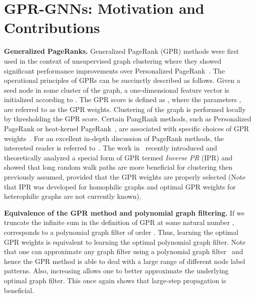 \documentclass{article} \usepackage{iclr2021_conference,times}
\begin{document}
\section{GPR-GNNs: Motivation and Contributions}\label{sec:GPRandGPGNN}
\textbf{Generalized PageRanks. }Generalized PageRank (GPR) methods were first used in the context of unsupervised graph clustering where they showed significant performance improvements over Personalized PageRank~\citep{kloumann2017block,li2019optimizing}. The operational principles of GPRs can be succinctly described as follows. Given a seed node  in some cluster of the graph, a one-dimensional feature vector  is initialized according to . The GPR score is defined as , where the parameters , are referred to as the GPR weights. Clustering of the graph is performed locally by thresholding the GPR score. Certain PangRank methods, such as Personalized PageRank or heat-kernel PageRank~\citep{chung2007heat}, are associated with specific choices of GPR weights~\citep{li2019optimizing}. For an excellent in-depth discussion of PageRank methods, the interested reader is referred to~\citep{gleich2015pagerank}. The work in~\citet{li2019optimizing} recently introduced and theoretically analyzed a special form of GPR termed \emph{Inverse PR} (IPR) and showed that long random walk paths are more beneficial for clustering then previously assumed, provided that the GPR weights are properly selected (Note that IPR was developed for homophilic graphs and optimal GPR weights for heterophilic graphs are not currently known). 

\textbf{Equivalence of the GPR method and polynomial graph filtering. } If we truncate the infinite sum in the definition of GPR at some natural number ,  corresponds to a polynomial graph filter of order . Thus, learning the optimal GPR weights is equivalent to learning the optimal polynomial graph filter. Note that one can approximate any graph filter using a polynomial graph filter~\citep{6494675} and hence the GPR method is able to deal with a large range of different node label patterns. Also, increasing  allows one to better approximate the underlying optimal graph filter. This once again shows that large-step propagation is beneficial.
\end{document}
